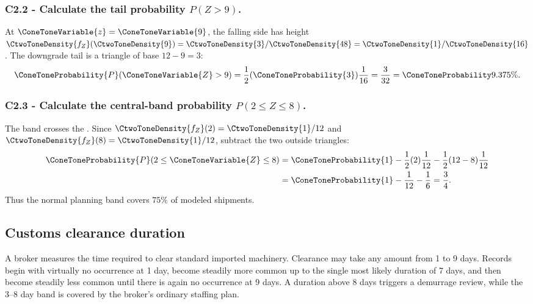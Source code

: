 \subsubsection*{C2.2 - Calculate the tail probability $P(Z>9)$.}
\label{subsec:c2-triangular-produce-b}
At $\ConeToneVariable{z}=\ConeToneVariable{9}$, the falling side has height $\CtwoToneDensity{f_Z}(\CtwoToneDensity{9})=\CtwoToneDensity{3}/\CtwoToneDensity{48}=\CtwoToneDensity{1}/\CtwoToneDensity{16}$.  The
downgrade tail is a triangle of base $12-9=3$:
\[
 \ConeToneProbability{P}(\ConeToneVariable{Z}>9)=\frac12(\ConeToneProbability{3})\frac1{16}=\frac3{32}=\ConeToneProbability{9.375\%}.
\]

\subsubsection*{C2.3 - Calculate the central-band probability
$P(2\le Z\le8)$.}
\label{subsec:c2-triangular-produce-c}
The band crosses the .  Since $\CtwoToneDensity{f_Z}(2)=\CtwoToneDensity{1}/12$ and $\CtwoToneDensity{f_Z}(8)=\CtwoToneDensity{1}/12$, subtract
the two outside triangles:
\[
 \begin{aligned}
 \ConeToneProbability{P}(2\le \ConeToneVariable{Z}\le8)
 &=\ConeToneProbability{1}-\frac12(2)\frac1{12}-\frac12(12-8)\frac1{12}\\
 &=\ConeToneProbability{1}-\frac1{12}-\frac16=\frac34.
 \end{aligned}
\]
Thus the normal planning band covers $75\%$ of modeled shipments.

\subsection{Customs clearance duration}\label{sec:c2-triangular-clearance}
A broker measures the time required to clear standard imported machinery.
Clearance may take any amount from 1 to 9 days.  Records begin with virtually
no occurrence at 1 day, become steadily more common up to the single most
likely duration of 7 days, and then become steadily less common until there is
again no occurrence at 9 days.  A duration above 8 days triggers a
demurrage review, while the 3--8 day band is covered by the broker's ordinary
staffing plan.

\begingroup{}
\endgroup

